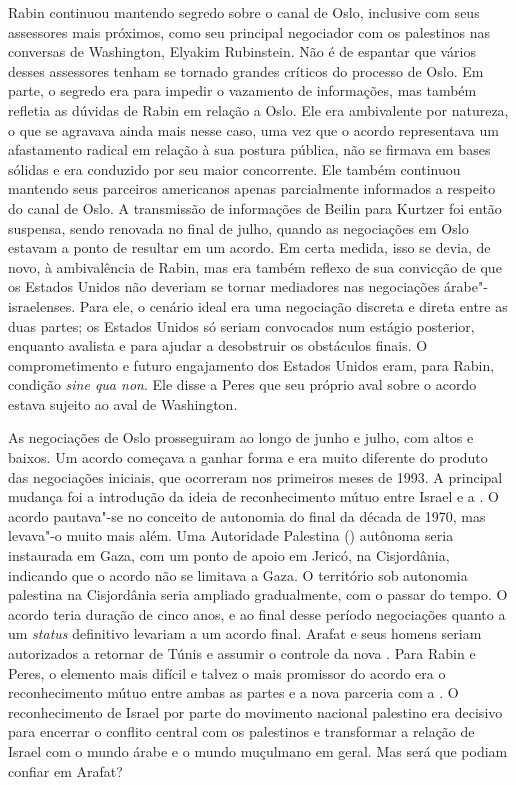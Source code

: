 Rabin continuou mantendo segredo sobre o canal de Oslo, inclusive com
seus assessores mais próximos, como seu principal negociador com os
palestinos nas conversas de Washington, Elyakim Rubinstein. Não é de
espantar que vários desses assessores tenham se tornado grandes críticos
do processo de Oslo. Em parte, o segredo era para impedir o vazamento de
informações, mas também refletia as dúvidas de Rabin em relação a Oslo.
Ele era ambivalente por natureza, o que se agravava ainda mais nesse
caso, uma vez que o acordo representava um afastamento radical em
relação à sua postura pública, não se firmava em bases sólidas e era
conduzido por seu maior concorrente. Ele também continuou mantendo seus
parceiros americanos apenas parcialmente informados a respeito do canal
de Oslo. A transmissão de informações de Beilin para Kurtzer foi então
suspensa, sendo renovada no final de julho, quando as negociações em
Oslo estavam a ponto de resultar em um acordo. Em certa medida, isso se
devia, de novo, à ambivalência de Rabin, mas era também reflexo de sua
convicção de que os Estados Unidos não deveriam se tornar mediadores nas
negociações árabe"-israelenses. Para ele, o cenário ideal era uma
negociação discreta e direta entre as duas partes; os Estados Unidos só
seriam convocados num estágio posterior, enquanto avalista e para
ajudar a desobstruir os obstáculos finais. O comprometimento e futuro
engajamento dos Estados Unidos eram, para Rabin, condição \emph{sine qua
non}. Ele disse a Peres que seu próprio aval sobre o acordo estava
sujeito ao aval de Washington.

As negociações de Oslo prosseguiram ao longo de junho e julho, com altos
e baixos. Um acordo começava a ganhar forma e era muito diferente do
produto das negociações iniciais, que ocorreram nos primeiros meses de
1993. A principal mudança foi a introdução da ideia de reconhecimento
mútuo entre Israel e a . O acordo pautava"-se no conceito de autonomia
do final da década de 1970, mas levava"-o muito mais além. Uma Autoridade
Palestina () autônoma seria instaurada em Gaza, com um ponto de apoio
em Jericó, na Cisjordânia, indicando que o acordo não se limitava a
Gaza. O território sob autonomia palestina na Cisjordânia seria ampliado
gradualmente, com o passar do tempo. O acordo teria duração de cinco
anos, e ao final desse período negociações quanto a um \emph{status} definitivo
levariam a um acordo final. Arafat e seus homens seriam autorizados a
retornar de Túnis e assumir o controle da nova . Para Rabin e Peres, o
elemento mais difícil e talvez o mais promissor do acordo era o
reconhecimento mútuo entre ambas as partes e a nova parceria com a .
O reconhecimento de Israel por parte do movimento nacional palestino era
decisivo para encerrar o conflito central com os palestinos e
transformar a relação de Israel com o mundo árabe e o mundo muçulmano em
geral. Mas será que podiam confiar em Arafat?

